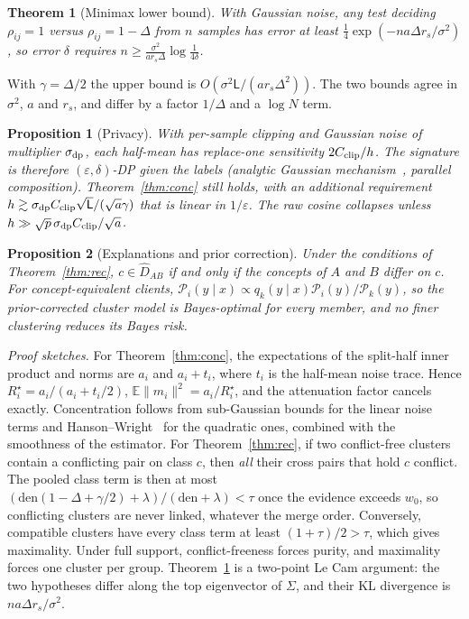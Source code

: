 \documentclass[journal]{IEEEtran}
\newtheorem{theorem}{Theorem}
\newtheorem{proposition}{Proposition}
\theoremstyle{definition}
\newcommand{\E}{\mathbb{E}}
\newcommand{\cP}{\mathcal{P}}
\begin{document}
\begin{theorem}[Minimax lower bound]\label{thm:lb}
With Gaussian noise, any test deciding $\rho_{ij}=1$ versus $\rho_{ij}=1-\Delta$ from $n$ samples has error at least $\frac14\exp(-na\Delta r_s/\sigma^2)$, so error $\delta$ requires $n\ge\frac{\sigma^2}{ar_s\Delta}\log\frac1{4\delta}$.
\end{theorem}
With $\gamma=\Delta/2$ the upper bound is $O(\sigma^2\mathsf L/(ar_s\Delta^2))$. The two bounds agree in $\sigma^2$, $a$ and $r_s$, and differ by a factor $1/\Delta$ and a $\log N$ term.
\begin{proposition}[Privacy]\label{prop:dp}
With per-sample clipping and Gaussian noise of multiplier $\sigma_{\rm dp}$, each half-mean has replace-one sensitivity $2C_{\rm clip}/h$. The signature is therefore $(\varepsilon,\delta)$-DP given the labels (analytic Gaussian mechanism~\cite{balle2018analytic}, parallel composition). Theorem~\ref{thm:conc} still holds, with an additional requirement $h\gtrsim\sigma_{\rm dp}C_{\rm clip}\sqrt{\mathsf L}/(\sqrt a\gamma)$ that is linear in $1/\varepsilon$. The raw cosine collapses unless $h\gg\sqrt p\,\sigma_{\rm dp}C_{\rm clip}/\sqrt a$.
\end{proposition}
\begin{proposition}[Explanations and prior correction]\label{prop:expl}
Under the conditions of Theorem~\ref{thm:rec}, $c\in\hat D_{AB}$ if and only if the concepts of $A$ and $B$ differ on $c$. For concept-equivalent clients, $\cP_i(y\mid x)\propto q_k(y\mid x)\cP_i(y)/\cP_k(y)$, so the prior-corrected cluster model is Bayes-optimal for every member, and no finer clustering reduces its Bayes risk.
\end{proposition}

\emph{Proof sketches.} For Theorem~\ref{thm:conc}, the expectations of the split-half inner product and norms are $a_i$ and $a_i+t_i$, where $t_i$ is the half-mean noise trace. Hence $R_i^\star=a_i/(a_i+t_i/2)$, $\E\|m_i\|^2=a_i/R_i^\star$, and the attenuation factor cancels exactly. Concentration follows from sub-Gaussian bounds for the linear noise terms and Hanson--Wright~\cite{rudelson2013hansonwright} for the quadratic ones, combined with the smoothness of the estimator. For Theorem~\ref{thm:rec}, if two conflict-free clusters contain a conflicting pair on class $c$, then \emph{all} their cross pairs that hold $c$ conflict. The pooled class term is then at most $(\mathrm{den}(1-\Delta+\gamma/2)+\lambda)/(\mathrm{den}+\lambda)<\tau$ once the evidence exceeds $w_0$, so conflicting clusters are never linked, whatever the merge order. Conversely, compatible clusters have every class term at least $(1+\tau)/2>\tau$, which gives maximality. Under full support, conflict-freeness forces purity, and maximality forces one cluster per group. Theorem~\ref{thm:lb} is a two-point Le Cam argument: the two hypotheses differ along the top eigenvector of $\Sigma$, and their KL divergence is $na\Delta r_s/\sigma^2$.
\end{document}
